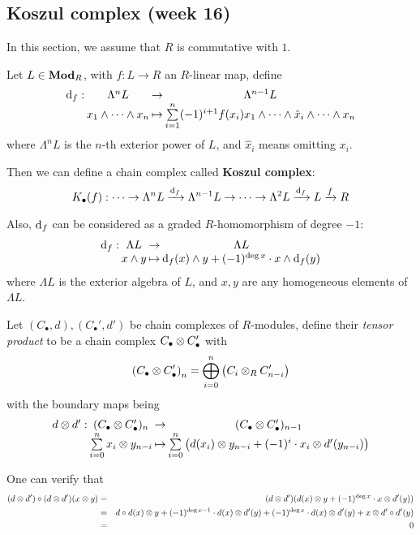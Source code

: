 \subsection{Koszul complex (week 16)}

\begin{remark}
  In this section, we assume that $R$ is commutative with $1$.
\end{remark}

\begin{definition}
  Let $L \in \mathbf{Mod}_R$, with $f: L \to R$ an $R$-linear map, define
  $$\deffunc{\df}{\Lambda^n L}{\Lambda^{n-1} L}{x_1 \we \cdots \we x_n}
  {\sum\limits_{i=1}^n (-1)^{i+1} f(x_i) x_1 \we \cdots \we \hat{x}_i \we
  \cdots \we x_n}$$
  where $\Lambda^n L$ is the $n$-th exterior power of $L$, and $\hat{x}_i$ means
  omitting $x_i$.

  Then we can define a chain complex called {\bf Koszul complex}:
  $$K_\bullet(f) : \cdots \to \Lambda^n L \xrightarrow{\mathrm{d}_f} \Lambda^{n-1} L \to \cdots \to
  \Lambda^2 L \xrightarrow{\mathrm{d}_f} L \xrightarrow{f} R$$

  Also, $\mathrm{d}_f$ can be considered as a graded $R$-homomorphism of degree $-1$:
  $$\deffunc{\df}{\Lambda L}{\Lambda L}{x \we y}
  {\df(x) \we y + (-1)^{\deg x}\cdot x \we \df(y)}$$
  where $\Lambda L$ is the exterior algebra of $L$, and $x, y$ are any homogeneous 
  elements of $\Lambda L$.
\end{definition}

\begin{definition}
  Let $(C_\bullet, d), (C_\bullet', d')$ be chain complexes of $R$-modules, 
  define their {\it tensor product} to be a chain complex $C_\bullet \otimes C_\bullet'$ with
  $$\left( C_\bullet \otimes C_\bullet' \right)_n = 
  \bigoplus\limits_{i=0}^n \left( C_i \otimes_R C_{n-i}' \right)$$
  with the boundary maps being
  $$\deffunc{d \Ot d'}{(C_\bullet \Ot C_\bullet')_n}{(C_\bullet \Ot C_\bullet')_{n-1}}
  {\sum\limits_{i=0}^n x_i \Ot y_{n-i}}{\sum\limits_{i=0}^n 
  \left( d(x_i) \Ot y_{n-i} + (-1)^i \cdot x_i \Ot d'(y_{n-i}) \right)}$$

  One can verify that 
  \begin{eqnarray*}
    (d \otimes d') \circ (d \otimes d') (x \otimes y) 
    &=& (d \otimes d') (d(x) \otimes y + (-1)^{\deg x} \cdot x \otimes d'(y)) \\
    &=& d \circ d (x) \otimes y + (-1)^{\deg x - 1} \cdot d(x) \otimes d'(y)
    + (-1)^{\deg x} \cdot d(x) \otimes d'(y) + x \otimes d' \circ d'(y) \\
    &=& 0
  \end{eqnarray*}
\end{definition}

